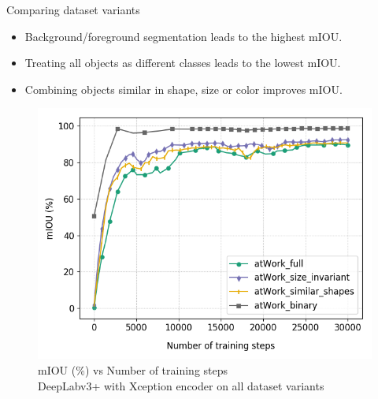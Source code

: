 \documentclass{beamer}
\begin{document}
\begin{frame}{Comparing dataset variants}
	\begin{small}
		\begin{itemize}
			\item Background/foreground segmentation leads to the highest mIOU.
			\item Treating all objects as different classes leads to the lowest mIOU.
			\item Combining objects similar in shape, size or color improves mIOU.
		\end{itemize}
	\end{small}
	
	\begin{figure}[h]
		\centering
		\includegraphics[width=0.4\linewidth]{images/xcep_4vars}
		\captionsetup{justification=centering,margin=2cm}
		\caption{mIOU (\%) vs Number of training steps \\ DeepLabv3+ with Xception encoder on all dataset variants}
		\label{Fig:variants}
	\end{figure}

\end{frame}


%
%
\end{document}
